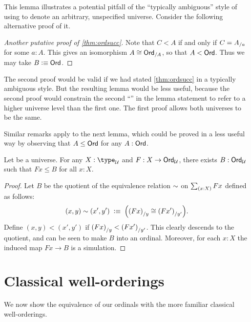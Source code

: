 This lemma illustrates a potential pitfall of the ``typically ambiguous'' style of using \UU to denote an arbitrary, unspecified universe.
Consider the following alternative proof of it.

\begin{proof}[Another putative proof of \autoref{thm:ordsucc}]
  Note that $C<A$ if and only if $C={A}_{/a}$ for some $a:A$.
  This gives an isomorphism $A \cong {\ensuremath{\mathsf{Ord}}}_{/A}$, so that $A<\mathsf{Ord}$.
  Thus we may take $B\vcentcolon\equiv\mathsf{Ord}$.
\end{proof}

The second proof would be valid if we had stated \autoref{thm:ordsucc} in a typically ambiguous style.
But the resulting lemma would be less useful, because the second proof would constrain the second ``\ord'' in the lemma statement to refer to a higher universe level than the first one.
The first proof allows both universes to be the same.

Similar remarks apply to the next lemma, which could be proved in a less useful way by observing that $A\le \mathsf{Ord}$ for any $A:\mathsf{Ord}$.

\begin{lem}\label{thm:ordunion}
  Let \bbU be a universe.
  For any $X:\type_\bbU$ and $F:X\to \mathsf{Ord}_\mathcal{U}$, there exists $B:\mathsf{Ord}_\mathcal{U}$ such that $Fx\le B$ for all $x:X$.
\end{lem}
\begin{proof}
  Let $B$ be the quotient of the equivalence relation $\sim$ on $\sm{x:X} Fx$ defined as follows:
  \[ (x,y) \sim (x',y')
  \;\vcentcolon\equiv\;
  \Big({(Fx)}_{/y} \cong {(Fx')}_{/y'}\Big).
  \]
  Define $(x,y)<(x',y')$ if ${(Fx)}_{/y} < {(Fx')}_{/y'}$.
  This clearly descends to the quotient, and can be seen to make $B$ into an ordinal.
  Moreover, for each $x:X$ the induced map $Fx\to B$ is a simulation.
\end{proof}



\section{Classical well-orderings}
\label{sec:wellorderings}

We now show the equivalence of our ordinals with the more familiar classical well-orderings.

